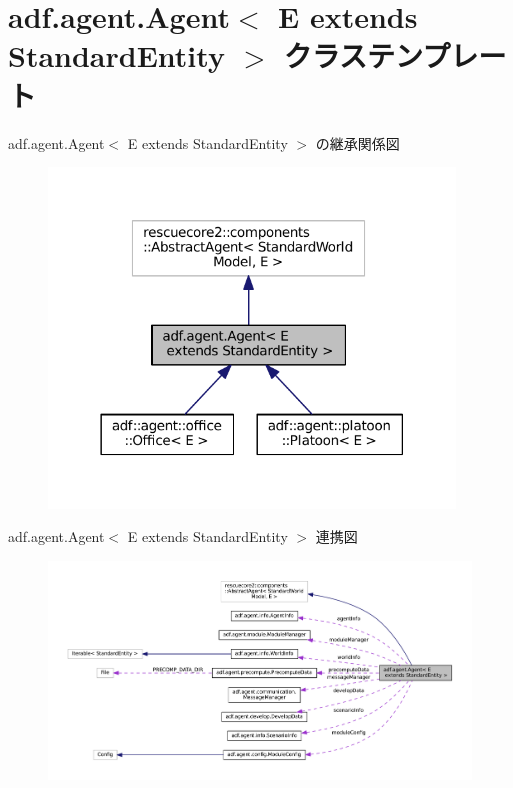 \hypertarget{classadf_1_1agent_1_1Agent}{}\section{adf.\+agent.\+Agent$<$ E extends Standard\+Entity $>$ クラステンプレート}
\label{classadf_1_1agent_1_1Agent}


adf.\+agent.\+Agent$<$ E extends Standard\+Entity $>$ の継承関係図
\nopagebreak
\begin{figure}[H]
\begin{center}
\leavevmode
\includegraphics[width=306pt]{classadf_1_1agent_1_1Agent__inherit__graph}
\end{center}
\end{figure}


adf.\+agent.\+Agent$<$ E extends Standard\+Entity $>$ 連携図
\nopagebreak
\begin{figure}[H]
\begin{center}
\leavevmode
\includegraphics[width=350pt]{classadf_1_1agent_1_1Agent__coll__graph}
\end{center}
\end{figure}
